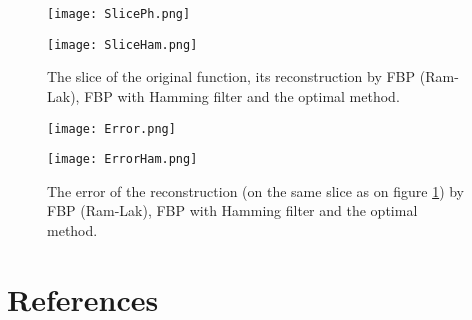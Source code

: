 \documentclass[12pt]{iopart}
\begin{document}
    \begin{figure}[H]    
        \begin{minipage}[t]{0.5\textwidth}
            \texttt{[image: SlicePh.png]}
        \end{minipage}
        \hspace{\fill}
        \begin{minipage}[t]{0.5\textwidth}
            \texttt{[image: SliceHam.png]}
        \end{minipage}
        \caption{The slice of the original function, its reconstruction by FBP (Ram-Lak), FBP with Hamming filter and the optimal method.}
        \label{Slice}
    \end {figure}    
    
    \begin{figure}[H]    
        \begin{minipage}[t]{0.5\textwidth}
            \texttt{[image: Error.png]}
        \end{minipage}
        \hspace{\fill}
        \begin{minipage}[t]{0.5\textwidth}
            \texttt{[image: ErrorHam.png]}
        \end{minipage}
        \caption{The error of the reconstruction (on the same slice as on figure \ref{Slice}) by FBP (Ram-Lak), FBP with Hamming filter and the optimal method.}
        \label{Error}
    \end {figure}    
	
	\section*{References}
	
	
	
\end{document}
